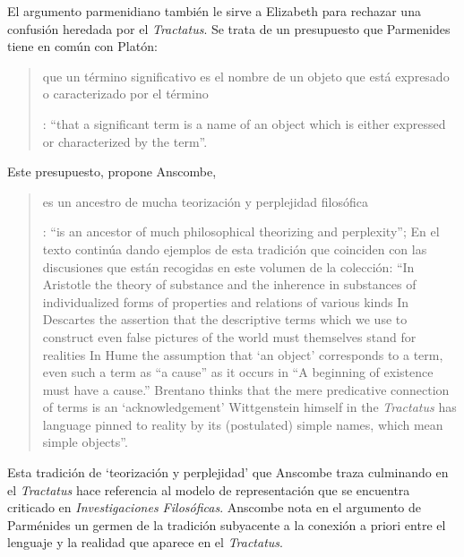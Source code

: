 El argumento parmenidiano también le sirve a Elizabeth para rechazar una confusión heredada por el \emph{Tractatus}. Se trata de un presupuesto que Parmenides tiene en común con Platón: \blockquote[{\Cite[x]{anscombe1981parmenides}}: \enquote{that a significant term is a name of an object which is either expressed or characterized by the term}.]{que un término significativo es el nombre de un objeto que está expresado o caracterizado por el término}. Este presupuesto, propone Anscombe, \blockquote[{\Cite[xi]{anscombe1981parmenides}}: \enquote{is an ancestor of much philosophical theorizing and perplexity}; En el texto continúa dando ejemplos de esta tradición que coinciden con las discusiones que están recogidas en este volumen de la colección: \enquote{In Aristotle \textelp{} the theory of substance and the inherence in substances of individualized forms of properties and relations of various kinds \textelp{} In Descartes \textelp{} the assertion that the descriptive terms which we use to construct even false pictures of the world must themselves stand for realities \textelp{} In Hume \textelp{} the assumption that `an object' corresponds to a term, even such a term as ``a cause'' as it occurs in ``A beginning of existence must have a cause.'' \textelp{} Brentano thinks that the mere predicative connection of terms is an `acknowledgement' \textelp{} Wittgenstein himself in the \emph{Tractatus} has language pinned to reality by its (postulated) simple names, which mean simple objects}.]{es un ancestro de mucha teorización y perplejidad filosófica}.
Esta tradición de \enquote*{teorización y perplejidad} que Anscombe traza culminando en el \emph{Tractatus} hace referencia al modelo de representación que se encuentra criticado en \emph{Investigaciones Filosóficas}. Anscombe nota en el argumento de Parménides un germen de la tradición subyacente a la conexión a priori entre el lenguaje y la realidad que aparece en el \emph{Tractatus}.

